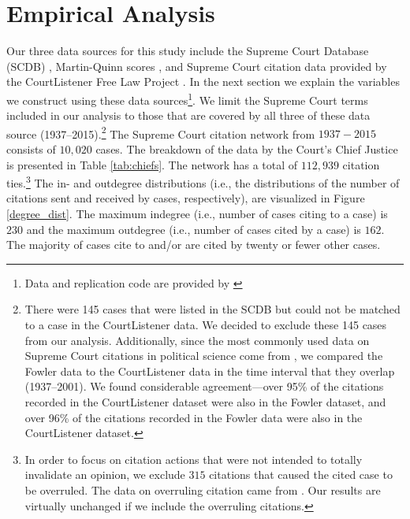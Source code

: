 \documentclass{cup-pan}
\begin{document}
 \section{Empirical Analysis}
Our three data sources for this study include the Supreme Court Database (SCDB) \citep{spaeth2014supreme}, Martin-Quinn scores \citep{martin2002dynamic}, and Supreme Court citation data provided by the CourtListener Free Law Project \citep{CourtListener}. In the next section we explain the variables we construct using these data sources\footnote{Data and replication code are provided by \citet{replicationdata}}. We limit the Supreme Court terms included in our analysis to those that are covered by all three of these data source (1937--2015).\footnote{There were 145 cases that were listed in the SCDB but could not be matched to a case in the CourtListener data. We decided to exclude these 145 cases from our analysis. Additionally, since the most commonly used data on Supreme Court citations in political science come from \citet{fowler2007network}, we compared the Fowler data to the CourtListener data in the time interval that they overlap (1937--2001). We found considerable agreement---over 95\% of the citations recorded in the CourtListener dataset were also in the Fowler dataset, and over 96\% of the citations recorded in the Fowler data were also in the CourtListener dataset.} The Supreme Court citation network from $1937 - 2015$ consists of $10,020$ cases. The breakdown of the data by the Court's Chief Justice is presented in Table \ref{tab:chiefs}. The network has a total of $112,939$ citation ties.\footnote{In order to focus on citation actions that were not intended to totally invalidate an opinion, we exclude $315$ citations that caused the cited case to be overruled. The data on overruling citation came from \citet{senate2016constitution}. Our results are virtually unchanged if we include the overruling citations.} The in- and outdegree distributions (i.e., the distributions of the number of citations sent and received by cases, respectively), are visualized in Figure \ref{degree_dist}. The maximum indegree (i.e., number of cases citing to a case) is $230$ and the maximum outdegree (i.e., number of cases cited by a case) is $162$. The majority of cases cite to and/or are cited by twenty or fewer other cases.
\end{document}
